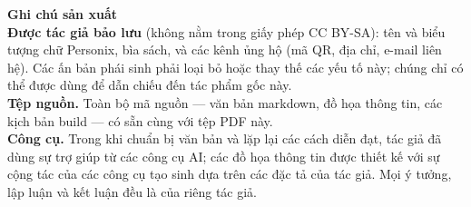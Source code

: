 \clearpage
\thispagestyle{empty}
\begin{flushleft}\small\sffamily
\textbf{Ghi chú sản xuất}\\[1.2em]

\textbf{Được tác giả bảo lưu} (không nằm trong giấy phép CC BY-SA): tên và
biểu tượng chữ Personix, bìa sách, và các kênh ủng hộ (mã QR, địa chỉ,
e-mail liên hệ). Các ấn bản phái sinh phải loại bỏ hoặc thay thế các yếu tố
này; chúng chỉ có thể được dùng để dẫn chiếu đến tác phẩm gốc này.\\[1.2em]

\textbf{Tệp nguồn.} Toàn bộ mã nguồn --- văn bản markdown, đồ họa thông tin,
các kịch bản build --- có sẵn cùng với tệp PDF này.\\[1.2em]

\textbf{Công cụ.} Trong khi chuẩn bị văn bản và lặp lại các cách diễn đạt, tác
giả đã dùng sự trợ giúp từ các công cụ AI; các đồ họa thông tin được thiết kế
với sự cộng tác của các công cụ tạo sinh dựa trên các đặc tả của tác giả.
Mọi ý tưởng, lập luận và kết luận đều là của riêng tác giả.
\end{flushleft}
\clearpage
